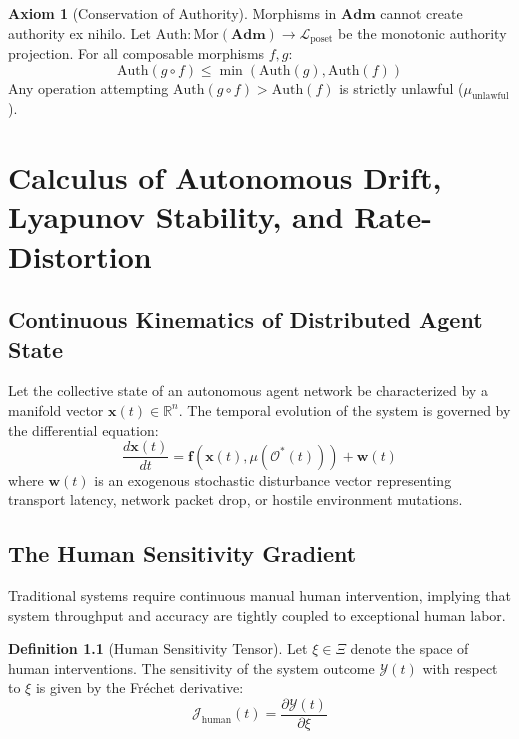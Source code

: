 \documentclass[12pt,oneside,a4paper]{book}
\theoremstyle{definition}
\newtheorem{definition}{Definition}[chapter]
\newtheorem{axiom}{Axiom}[chapter]
\theoremstyle{plain}
\theoremstyle{remark}
\begin{document}
\begin{axiom}[Conservation of Authority]
Morphisms in $\mathbf{Adm}$ cannot create authority ex nihilo. Let $\mathrm{Auth}: \text{Mor}(\mathbf{Adm}) \to \mathcal{L}_{\text{poset}}$ be the monotonic authority projection. For all composable morphisms $f, g$:
\begin{equation}
    \mathrm{Auth}(g \circ f) \le \min(\mathrm{Auth}(g), \mathrm{Auth}(f))
\end{equation}
Any operation attempting $\mathrm{Auth}(g \circ f) > \mathrm{Auth}(f)$ is strictly unlawful ($\mu_{\text{unlawful}}$).
\end{axiom}

\chapter{Calculus of Autonomous Drift, Lyapunov Stability, and Rate-Distortion}

\section{Continuous Kinematics of Distributed Agent State}
Let the collective state of an autonomous agent network be characterized by a manifold vector $\mathbf{x}(t) \in \mathbb{R}^n$. The temporal evolution of the system is governed by the differential equation:
\begin{equation}
    \frac{d\mathbf{x}(t)}{dt} = \mathbf{f}(\mathbf{x}(t), \mu(\mathcal{O}^*(t))) + \mathbf{w}(t)
\end{equation}
where $\mathbf{w}(t)$ is an exogenous stochastic disturbance vector representing transport latency, network packet drop, or hostile environment mutations.

\section{The Human Sensitivity Gradient}
Traditional systems require continuous manual human intervention, implying that system throughput and accuracy are tightly coupled to exceptional human labor. 

\begin{definition}[Human Sensitivity Tensor]
Let $\xi \in \Xi$ denote the space of human interventions. The sensitivity of the system outcome $\mathcal{Y}(t)$ with respect to $\xi$ is given by the Fréchet derivative:
\begin{equation}
    \mathcal{J}_{\text{human}}(t) = \frac{\partial \mathcal{Y}(t)}{\partial \xi}
\end{equation}
\end{definition}
\end{document}
